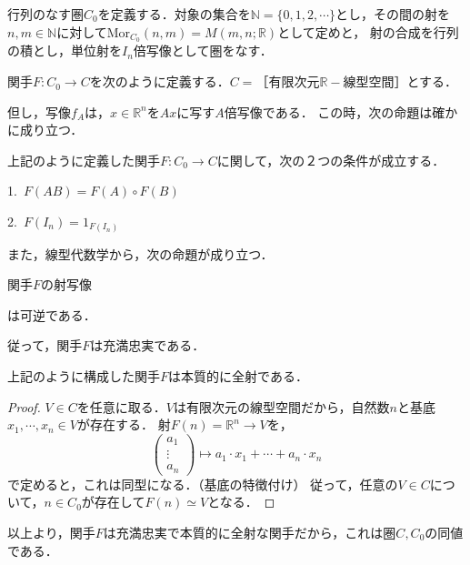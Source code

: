 \documentclass[uplatex, dvipdfmx]{jsreport}
\begin{document}
\begin{example}
    行列のなす圏$C_0$を定義する．対象の集合を$\mathbb{N}=\{0,1,2,\cdots\}$とし，その間の射を$n,m\in\mathbb{N}$に対して$\mathrm{Mor}_{C_0}(n,m)=M(m,n;\mathbb{R})$として定めと，
    射の合成を行列の積とし，単位射を$I_n$倍写像として圏をなす．

    関手$F:C_0\to C$を次のように定義する．$C=［有限次元\mathbb{R}-線型空間］$とする．
    \begin{center}\end{center}
    但し，写像$f_A$は，$x\in\mathbb{R}^n$を$Ax$に写す$A$倍写像である．
    この時，次の命題は確かに成り立つ．
    \begin{proposition}
        上記のように定義した関手$F:C_0\to C$に関して，次の２つの条件が成立する．\rm{}

        1.\, $F(AB) = F(A)\circ F(B)$

        2.\, $F(I_n) = 1_{F(I_n)}$
    \end{proposition}
    また，線型代数学から，次の命題が成り立つ．
    \begin{proposition}
        関手$F$の射写像
        \begin{center}\end{center}
        は可逆である．
    \end{proposition}
    従って，関手$F$は充満忠実である．
    \begin{proposition}
        上記のように構成した関手$F$は本質的に全射である．
    \end{proposition}
    \begin{proof}
        $V\in C$を任意に取る．$V$は有限次元の線型空間だから，自然数$n$と基底$x_1,\cdots,x_n\in V$が存在する．
        射$F(n)=\mathbb{R}^n\to V$を，
        $$\left( \begin{array}{c}
            a_1 \\ \vdots \\ a_n
        \end{array} \right)\mapsto a_1\cdot x_1 + \cdots + a_n\cdot x_n$$
        で定めると，これは同型になる．（基底の特徴付け）
        従って，任意の$V\in C$について，$n\in C_0$が存在して$F(n)\simeq V$となる．
    \end{proof}
    以上より，関手$F$は充満忠実で本質的に全射な関手だから，これは圏$C,C_0$の同値である．
\end{example}
\end{document}

